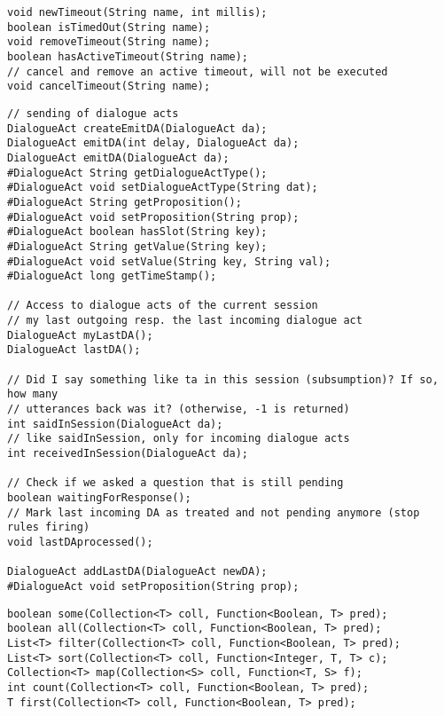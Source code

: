 \begin{small}
\begin{lstlisting}
void newTimeout(String name, int millis);
boolean isTimedOut(String name);
void removeTimeout(String name);
boolean hasActiveTimeout(String name);
// cancel and remove an active timeout, will not be executed
void cancelTimeout(String name);
\end{lstlisting}
\end{small}

\begin{small}
\begin{lstlisting}
// sending of dialogue acts
DialogueAct createEmitDA(DialogueAct da);
DialogueAct emitDA(int delay, DialogueAct da);
DialogueAct emitDA(DialogueAct da);
#DialogueAct String getDialogueActType();
#DialogueAct void setDialogueActType(String dat);
#DialogueAct String getProposition();
#DialogueAct void setProposition(String prop);
#DialogueAct boolean hasSlot(String key);
#DialogueAct String getValue(String key);
#DialogueAct void setValue(String key, String val);
#DialogueAct long getTimeStamp();

// Access to dialogue acts of the current session
// my last outgoing resp. the last incoming dialogue act
DialogueAct myLastDA();
DialogueAct lastDA();

// Did I say something like ta in this session (subsumption)? If so, how many
// utterances back was it? (otherwise, -1 is returned)
int saidInSession(DialogueAct da);
// like saidInSession, only for incoming dialogue acts
int receivedInSession(DialogueAct da);

// Check if we asked a question that is still pending
boolean waitingForResponse();
// Mark last incoming DA as treated and not pending anymore (stop rules firing)
void lastDAprocessed();

DialogueAct addLastDA(DialogueAct newDA);
#DialogueAct void setProposition(String prop);
\end{lstlisting}
\end{small}

\begin{small}
\begin{lstlisting}
boolean some(Collection<T> coll, Function<Boolean, T> pred);
boolean all(Collection<T> coll, Function<Boolean, T> pred);
List<T> filter(Collection<T> coll, Function<Boolean, T> pred);
List<T> sort(Collection<T> coll, Function<Integer, T, T> c);
Collection<T> map(Collection<S> coll, Function<T, S> f);
int count(Collection<T> coll, Function<Boolean, T> pred);
T first(Collection<T> coll, Function<Boolean, T> pred);
\end{lstlisting}
\end{small}

